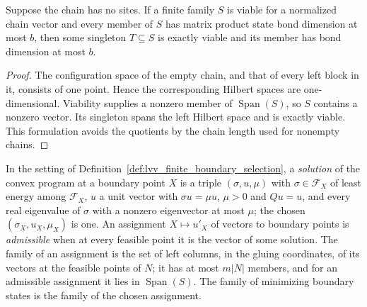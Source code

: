 \begin{lemma}
    \label{thm:lvv_size_trimmed_family_empty_chain}
    \leanok
    Suppose the chain has no sites.  If a finite family $S$ is viable for a
    normalized chain vector and every member of $S$ has matrix product state
    bond dimension at most $b$, then some singleton $T\subseteq S$ is exactly
    viable and its member has bond dimension at most $b$.
\end{lemma}
\begin{proof}
    \leanok
    The configuration space of the empty chain, and that of every left block
    in it, consists of one point.  Hence the corresponding Hilbert spaces are
    one-dimensional.  Viability supplies a nonzero member of
    $\operatorname{Span}(S)$, so $S$ contains a nonzero vector.  Its singleton
    spans the left Hilbert space and is exactly viable.  This formulation
    avoids the quotients by the chain length used for nonempty chains.
\end{proof}

\begin{definition}
    \label{def:lvv_boundary_program_solution}
    \leanok
    In the setting of Definition~\ref{def:lvv_finite_boundary_selection}, a
    \emph{solution} of the convex program at a boundary point $X$ is a triple
    $(\sigma,u,\mu)$ with $\sigma\in\mathcal F_X$ of least energy among
    $\mathcal F_X$, $u$ a unit vector with $\sigma u=\mu u$, $\mu>0$ and $Qu=u$,
    and every real eigenvalue of $\sigma$ with a nonzero eigenvector at most
    $\mu$; the chosen $(\sigma_X,u_X,\mu_X)$ is one. An assignment $X\mapsto
        u'_X$ of vectors to boundary points is \emph{admissible} when at every
    feasible point it is the vector of some solution. The family of an
    assignment is the set of left columns, in the gluing coordinates, of its
    vectors at the feasible points of $N$; it has at most $m|N|$ members, and for
    an admissible assignment it lies in $\operatorname{Span}(S)$. The family of
    minimizing boundary states is the family of the chosen assignment.
\end{definition}


